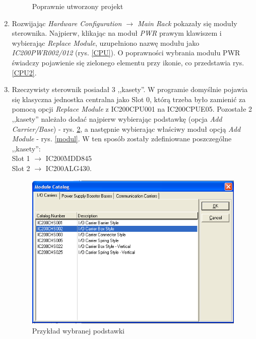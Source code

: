 \documentclass[12pt]{article}
\begin{document}
\begin{enumerate}
\begin{figure}[H]
        \caption{Poprawnie utworzony projekt}
        \label{utworzony_projekt}
    \end{figure}
    \item Rozwijając \textit{Hardware Configuration $\rightarrow$ Main Rack} pokazały się moduły sterownika. Najpierw, klikając na moduł \textit{PWR} prawym klawiszem i wybierając \textit{Replace Module}, uzupełniono nazwę modułu jako \textit{IC200PWR002/012} (rys. \ref{CPU}). O poprawności wybrania modułu PWR świadczy pojawienie się zielonego elementu przy ikonie, co przedstawia rys. \ref{CPU2}.
    \item Rzeczywisty sterownik posiadał 3 ,,kasety''. W programie domyślnie pojawia się klasyczna jednostka centralna jako Slot 0, którą trzeba było zamienić za pomocą opcji \textit{Replace Module} z IC200CPU001 na IC200CPUE05. Pozostałe 2 ,,kasety'' należało dodać najpierw wybierając podstawkę (opcja \textit{Add Carrier/Base}) - rys. \ref{podstawka}, a następnie wybierając właściwy moduł opcją \textit{Add Module} - rys. \ref{modul}. W ten sposób zostały zdefiniowane poszczególne ,,kasety'': \\
    Slot 1 $\rightarrow$ IC200MDD845 \\
    Slot 2 $\rightarrow$ IC200ALG430. 
    \begin{figure}[H]
        \centering
        \includegraphics[scale=0.8]{./zdj/podstawka.png}
        \caption{Przykład wybranej podstawki}
        \label{podstawka}
    \end{figure}
    \begin{figure}[H]

\end{figure}
\end{enumerate}
\end{document}
